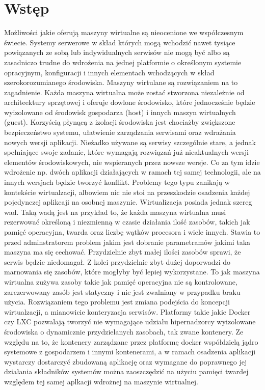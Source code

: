 \documentclass[polish, a4paper, 12pt, oneside]{book}
\begin{document}
\tableofcontents{}

\chapter{Wstęp}
Możliwości jakie oferują maszyny wirtualne są nieocenione we współczesnym świecie. Systemy serwerowe w skład których mogą wchodzić nawet tysiące powiązanych ze sobą lub indywidualnych serwisów nie mogą być albo są zasadniczo trudne do wdrożenia na jednej platformie o określonym systemie opracyjnym, konfiguracji i innych elementach wchodzących w skład szerokorozumianego środowiska. Maszyny wirtulane są rozwiązaniem na to zagadnienie. Każda maszyna wirtualna może zostać stworzona niezależnie od architeektury sprzętowej i oferuje dowlone środowisko, które jednocześnie będzie wyizolowane od środowisk gospodarza (host) i innych maszyn wirtualnych (guest). Korzyścią płynącą z izolacji środowiska jest chociażby zwiększone bezpieczeństwo systemu, ułatwienie zarządzania serwisami oraz wdrażania nowych wersji aplikacji. Nieżadko używane są serwisy szczególnie stare, a jednak spełniające swoje zadanie, które wymagają rozwiązań już nieaktualnych wersji elementów środowiskowych, nie wspieranych przez nowsze wersje. Co za tym idzie wdrożenie np. dwóch aplikacji działających w ramach tej samej technologii, ale na innych wersjach będzie tworzyć konflikt. Problemy tego typu zanikają w kontekście wirtualzacji, albowiem nic nie stoi na przeszkodzie osadzenia każdej pojedynczej aplikcaji na osobnej maszynie. Wirtualizacja posiada jednak szereg wad. Taką wadą jest na przykład to, że każda maszyna wirtualna musi rezerwować określoną i niezmienną w czasie działania ilość zasobów, takich jak pamięć operacyjna, twarda oraz liczbę wątków procesora i wiele innych. Stawia to przed adminstratorem problem jakim jest dobranie parametramów jakimi taka maszyna ma się cechować. Przydzielnie zbyt małej ilości zasobów sprawi, że serwis będzie niedomagał. Z kolei przydzielnie zbyt dużej doporwadzi do marnowania się zasobów, które mogłyby być lepiej wykorzystane. To jak maszyna wirtualna zużywa zasoby takie jak pamięć operacyjna nie są kontrolowane, zarezerwowany zasób jest statyczny i nie jest zwalniany w przypadku braku użycia. Rozwiązaniem tego problemu jest zmiana podejścia do koncepcji wirtualzacji, a mianowicie konteryzacja serwisów. Platformy takie jakie Docker czy LXC pozwalają tworzyć nie wymagające udziału hipernadzorcy wyizolowane środowiska o dynamicznie przydzielanych zasobach, tak zwane kontenery. Ze względu na to, że kontenery zarządzane przez platformę docker współdzielą jądro systemowe z gospodarzem i innymi kontenerami, a w ramach osadzenia aplikacji wystarczy dostarczyć zbudowaną aplikację oraz wymagane do poprawnego jej działania składników systemów można zaoszczędzić na użyciu pamięci twardej względem tej samej aplkacji wdrożnej na maszynie wirtualnej. 
\end{document}

